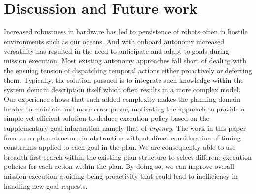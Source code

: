 \section{Discussion and Future work}
\label{sec:conclude}

Increased robustness in hardware has led to persistence of robots
often in hostile environments such as our oceans. And with onboard
autonomy increased versatility has resulted in the need to anticipate
and adapt to goals during mission execution.  Most existing autonomy
approaches fall short of dealing with the ensuing tension of
dispatching temporal actions either proactively or deferring them.
Typically, the solution pursued is to integrate such knowledge within
the system domain description itself which often results in a more
complex model. Our experience shows that such added complexity makes
the planning domain harder to maintain and more error prone,
motivating the approach to provide a simple yet efficient solution to
deduce execution policy based on the supplementary goal information
namely that of {\em urgency}.  The work in this paper focuses on plan
structure in abstraction without direct consideration of timing
constraints applied to each goal in the plan. We are consequently able
to use breadth first search within the existing plan structure to
select different execution policies for each action within the
plan. By doing so, we can improve overall mission execution avoiding
being proactivity that could lead to inefficiency in handling new goal
requests.


